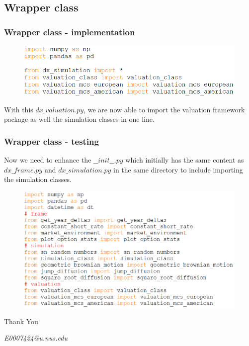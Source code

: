 \documentclass{beamer}
\begin{document}
\subsection{Wrapper class}
\begin{frame}
\frametitle{Wrapper class - implementation}
\begin{figure}[H]
	\includegraphics[scale=0.48]{wrapper_class.png}
\end{figure}
With this $dx\_valuation.py$, we are now able to import the valuation framework package as well the simulation classes in one line.
\end{frame}

\begin{frame}
\frametitle{Wrapper class - testing}
Now we need to enhance the $\_\_init\_\_.py$ which initially has the same content as $dx\_frame.py$ and $dx\_simulation.py$ in the same directory to include importing the simulation classes.
\begin{figure}[H]
	\includegraphics[scale=0.48]{overall_wrapper_class.png}
\end{figure}
\end{frame}

\begin{frame}
\Huge{\centerline{Thank You}}
\begin{center}
\begin{normalsize}
\emph{E0007424@u.nus.edu}
\end{normalsize}
\end{center}
\end{frame}

\end{document}
